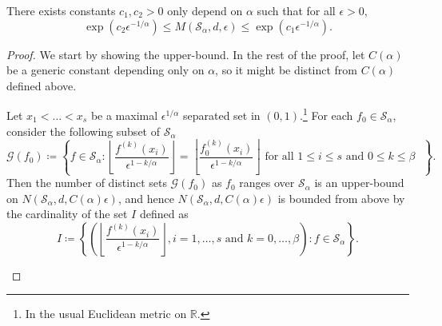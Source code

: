 \begin{theorem}\label{pf-thm:metric-entropy}
	There exists constants \(c_1, c_2 > 0\) only depend on \(\alpha \) such that for all \(\epsilon > 0\),
	\[
		\exp \left( c_2 \epsilon ^{-1 / \alpha } \right)
		\leq M(\mathcal{S} _\alpha , d, \epsilon )
		\leq \exp \left( c_1 \epsilon ^{-1 / \alpha } \right) .
	\]
\end{theorem}
\begin{proof}
	We start by showing the upper-bound. In the rest of the proof, let \(C(\alpha )\) be a generic constant depending only on \(\alpha \), so it might be distinct from \(C(\alpha )\) defined above.

	\begin{claim}\label{clm:metric-entropy-a}
		Let \(x_1 < \dots < x_s\) be a maximal \(\epsilon ^{1 / \alpha }\) separated set in \((0, 1)\).\footnote{In the usual Euclidean metric on \(\mathbb{R} \).} For each \(f_0 \in \mathcal{S} _\alpha \), consider the following subset of \(\mathcal{S} _\alpha \)
		\[
			\mathcal{G} (f_0) \coloneqq \left\{ f\in \mathcal{S} _\alpha \colon \left\lfloor \frac{f^{(k)}(x_i)}{\epsilon ^{1 - k / \alpha }} \right\rfloor = \left\lfloor \frac{f_0^{(k)}(x_i)}{\epsilon ^{1 - k / \alpha }} \right\rfloor \text{ for all \(1 \leq i \leq s\) and \(0 \leq k \leq \beta \) } \right\}.
		\]
		Then the number of distinct sets \(\mathcal{G} (f_0)\) as \(f_0\) ranges over \(\mathcal{S} _\alpha \) is an upper-bound on \(N(\mathcal{S} _\alpha , d, C(\alpha )\epsilon )\), and hence \(N(\mathcal{S} _\alpha , d, C(\alpha )\epsilon )\) is bounded from above by the cardinality of the set \(I\) defined as
		\[
			I \coloneqq \left\{ \left( \left\lfloor \frac{f^{(k)}(x_i)}{\epsilon ^{1 - k / \alpha }} \right\rfloor,i = 1, \dots , s \text{ and } k = 0, \dots , \beta  \right) \colon f\in \mathcal{S} _\alpha  \right\}.
		\]
	\end{claim}
	\begin{explanation}

\end{explanation}
\end{proof}
